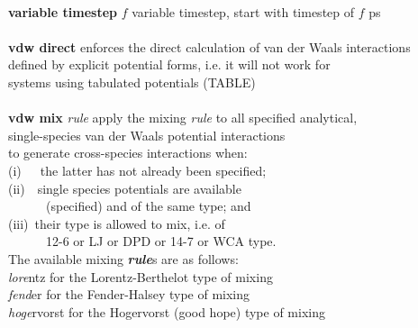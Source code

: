 \begin{tabbing}
\>                                              \> \\
\> {\bf variable timestep} $f$                  \> variable timestep, start with timestep of $f$ ps \\
\>                                              \> \\
\> {\bf vdw direct}                             \> enforces the direct calculation of van der Waals interactions \\
\>                                              \> defined by explicit potential forms, i.e. it will not work for \\
\>                                              \> systems using tabulated potentials (TABLE) \\
\>                                              \> \\
\> {\bf vdw mix}  {\em rule}                    \> apply the mixing {\em rule} to all specified analytical, \\
\>                                              \> single-species van der Waals potential interactions \\
\>                                              \> to generate cross-species interactions when: \\
\>                                              \> \phantom{x} (i)~~~the latter has not already been specified; \\
\>                                              \> \phantom{x} (ii)~~single species potentials are available \\
\>                                              \> \phantom{x} ~~~~~~(specified) and of the same type; and \\
\>                                              \> \phantom{x} (iii)~their type is allowed to mix, i.e. of \\
\>                                              \> \phantom{x} ~~~~~~12-6 or LJ or DPD or 14-7 or WCA type. \\
\>                                              \> The available mixing {\bf \em rule}s are as follows: \\
\>                                              \> \phantom{x} {\em lore}ntz for the Lorentz-Berthelot type of mixing \\
\>                                              \> \phantom{x} {\em fend}er for the Fender-Halsey type of mixing \\
\>                                              \> \phantom{x} {\em hoge}rvorst for the Hogervorst (good hope) type of mixing \\

\end{tabbing}
